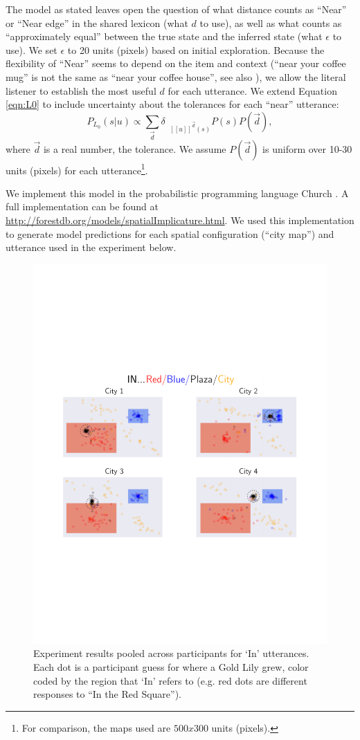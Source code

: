 \documentclass[10pt,letterpaper]{article}
\newcommand{\denote}[1]{\mbox{ $[\![ #1 ]\!]$}}
\begin{document}
The model as stated leaves open the question of what distance counts as ``Near'' or ``Near edge'' in the shared lexicon (what $d$ to use), as well as what counts as ``approximately equal'' between the true state and the inferred state (what $\epsilon$ to use). We set $\epsilon$ to 20 units (pixels) based on initial exploration. Because the flexibility of ``Near'' seems to depend on the item and context (``near your coffee mug'' is not the same as ``near your coffee house'', see also ), we allow the literal listener to establish the most useful $d$ for each utterance.
We extend Equation \ref{eqn:L0} to include uncertainty about the tolerances for each ``near'' utterance:
\begin{equation}
P_{L_0}(s|u)\propto \sum_{\vec{d}} \delta_{\denote{u}^{\vec{d}}(s)} P(s) P(\vec{d})\label{eqn:L0tol},
\end{equation}
where $\vec{d}$ is a real number, the tolerance. We assume $P(\vec{d})$ is uniform over 10-30 units (pixels) for each utterance\footnote{For comparison, the maps used are $500x300$ units (pixels).}. 

We implement this model in the probabilistic programming language Church \cite{goodman2012church}. A full implementation can be found at \url{http://forestdb.org/models/spatialImplicature.html}. We used this implementation to generate model predictions for each spatial configuration (``city map'') and utterance used in the experiment below.

\begin{figure}[!t]
\center
\includegraphics[width=.7\textwidth]{figures/In.pdf}
\caption{Experiment results pooled across participants for `In' utterances. Each dot is a participant guess for where a Gold Lily grew, color coded by the region that `In' refers to (e.g. red dots are different responses to ``In the Red Square'').}
\label{fig:In}
\end{figure}
\end{document}
